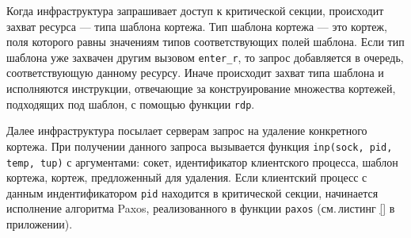 Когда инфраструктура запрашивает доступ к критической секции, происходит захват ресурса --- типа шаблона кортежа. Тип шаблона кортежа --- это кортеж, поля которого равны значениям типов соответствующих полей шаблона. Если тип шаблона уже захвачен другим вызовом \texttt{enter_r}, то запрос добавляется в очередь, соответствующую данному ресурсу. Иначе происходит захват типа шаблона и исполняются инструкции, отвечающие за конструирование множества кортежей, подходящих под шаблон, с помощью функции \texttt{rdp}.

Далее инфраструктура посылает серверам запрос на удаление конкретного кортежа. При получении данного запроса вызывается функция \texttt{inp(sock, pid, temp, tup)} с аргументами: сокет, идентификатор клиентского процесса, шаблон кортежа, кортеж, предложенный для удаления. Если клиентский процесс с данным индентификатором \texttt{pid} находится в критической секции, начинается исполнение алгоритма Paxos, реализованного в функции \texttt{paxos} (см.\,листинг \ref{} в приложении).

